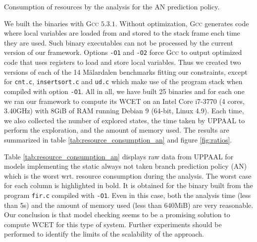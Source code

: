
  
  \begin{table}[ht]
    \centering
    \caption{Consumption of resources by the analysis for the AN prediction policy.}
    \label{tab:resource_consumption_an}
    \vspace{1em}
    
  \end{table}
  
  We built the binaries with \textsc{Gcc} $5.3.1$.
  Without optimization, \textsc{Gcc} generates code where local variables are
  loaded from and stored to the stack frame each time they are used.
  Such binary executables can not be processed by the current version of our framework.
  Options \texttt{-O1} and \texttt{-O2} force \textsc{Gcc} to output optimized code that uses registers to load and store local variables.
  Thus we created two versions of each of the 14 Mälardalen benchmarks
  fitting our constraints, except for \texttt{cnt.c}, \texttt{insertsort.c} and
  \texttt{ud.c} which make use of the program stack when compiled with option \texttt{-O1}.
  All in all, we have built 25 binaries and for each one we ran our framework to
  compute its WCET on an Intel Core i7-3770 (4 cores, 3.40GHz) with 8GiB of RAM running Debian 9 (64-bit, Linux 4.9).
  Each time, we also collected the number of explored states, the time taken by UPPAAL to perform the exploration, and the amount of memory used.
  The results are summarized in table \ref{tab:resource_consumption_an} and
  figure \ref{fig:ratios}.
  
  Table \ref{tab:resource_consumption_an} displays raw data from UPPAAL for
  models implementing the static always not taken branch prediction policy (AN) which is the worst wrt. resource consumption during the analysis. 
  The worst case for each column is highlighted in bold.
  It is obtained for the binary built from the program \texttt{fir.c} compiled with \texttt{-O1}.
  Even in this case, both the analysis time (less than 5s) and the amount of memory used (less than 640MiB) are very reasonable.
  Our conclusion is that model checking seems to be a promising solution to compute WCET for this type of system.
  Further experiments should be performed to identify the limits of the scalability of the approach.

